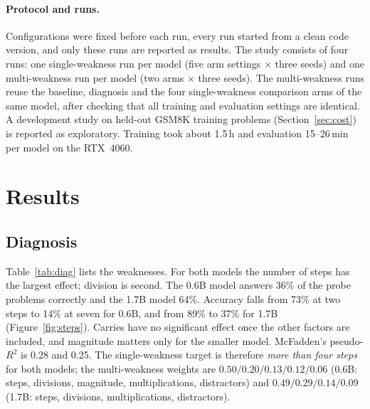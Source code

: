 \documentclass[11pt]{article}
\begin{document}
\paragraph{Protocol and runs.} Configurations were fixed before each run, every run started from a clean code version,
and only these runs are reported as results. The study consists of four runs: one single-weakness run per model
(five arm settings $\times$ three seeds) and one multi-weakness run per model (two arms $\times$ three seeds). The
multi-weakness runs reuse the baseline, diagnosis and the four single-weakness comparison arms of the same model, after
checking that all training and evaluation settings are identical. A development study on held-out GSM8K training
problems (Section~\ref{sec:cost}) is reported as exploratory. Training took about 1.5\,h and evaluation 15--26\,min per
model on the RTX~4060.

\section{Results}

\subsection{Diagnosis}
Table~\ref{tab:diag} lists the weaknesses. For both models the number of steps has the largest effect; division is
second. The 0.6B model answers 36\% of the probe problems correctly and the 1.7B model 64\%. Accuracy falls from 73\% at
two steps to 14\% at seven for 0.6B, and from 89\% to 37\% for 1.7B (Figure~\ref{fig:steps}). Carries have no significant effect once the other
factors are included, and magnitude matters only for the smaller model. McFadden's pseudo-$R^2$ \citep{mcfadden1974} is
0.28 and 0.25. The single-weakness target is therefore \emph{more than four steps} for both models; the multi-weakness
weights are $0.50/0.20/0.13/0.12/0.06$ (0.6B: steps, divisions, magnitude, multiplications, distractors) and
$0.49/0.29/0.14/0.09$ (1.7B: steps, divisions, multiplications, distractors).
\end{document}
